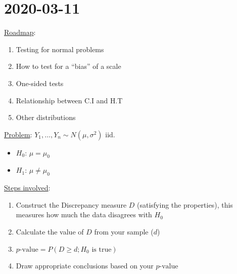\section{2020-03-11}
\underline{Roadmap}:
\begin{enumerate}[label=(\roman*)]
    \item Testing for normal problems
    \item How to test for a ``bias'' of a scale
    \item One-sided tests
    \item Relationship between C.I and H.T
    \item Other distributions
\end{enumerate}
\underline{Problem}: $ Y_1,\ldots ,Y_n \sim N(\mu,\sigma^2) $ iid.
\begin{itemize}
    \item $ H_0 $: $ \mu=\mu_0 $
    \item $ H_1 $: $ \mu\neq \mu_0 $
\end{itemize}
\underline{Steps involved}:
\begin{enumerate}[label=(\roman*)]
    \item Construct the Discrepancy measure $ D $ (satisfying the properties), this
          measures how much the data disagrees with $ H_0 $
    \item Calculate the value of $ D $ from your sample ($ d $)
    \item $ p\text{-value}=P(D\geqslant d; H_0\text{ is true}) $
    \item Draw appropriate conclusions based on your $ p\text{-value} $
\end{enumerate}

